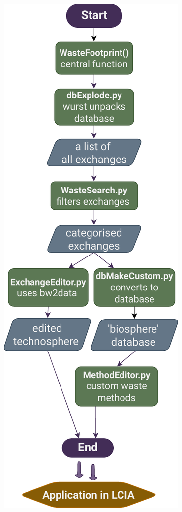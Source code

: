 \documentclass[a0paper,fleqn]{betterposter}
\begin{document}
{\includegraphics[width=\textwidth]{img/Flowchart_WasteFootprint}

}
\end{document}
